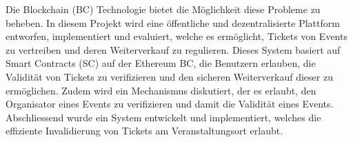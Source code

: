 Die Blockchain (BC) Technologie bietet die M{\"o}glichkeit diese Probleme zu beheben. In diesem Projekt wird eine {\"o}ffentliche und dezentralisierte Plattform entworfen, implementiert und evaluiert, welche es erm{\"o}glicht, Tickets von Events zu vertreiben und deren Weiterverkauf zu regulieren. Dieses System basiert auf Smart Contracts (SC) auf der Ethereum BC, die Benutzern erlauben, die Validit{\"a}t von Tickets zu verifizieren und den sicheren Weiterverkauf dieser zu erm{\"o}glichen. Zudem wird ein Mechanismus diskutiert, der es erlaubt, den Organisator eines Events zu verifizieren und damit die Validit{\"a}t eines Events. Abschliessend wurde ein System entwickelt und implementiert, welches die effiziente Invalidierung von Tickets am Veranstaltungsort erlaubt.

